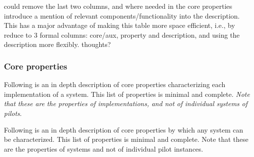 \documentclass{sig-alternate}
\begin{document}
\begin{table}
{{    could remove the last two columns, and where needed in the core properties
    introduce a mention of relevant components/functionality into the
    description. This has a major advantage of making this table more space
    efficient, i.e., by reduce to 3 formal columns: core/aux,
    property and description, and using the description more flexibly. thoughts?}
}
\label{table:property_component_mapping}
\end{table}

\subsubsection{Core properties}
\label{sec:coreprops}

Following is an in depth description of core properties characterizing each
implementation of a \pilot system. This list of properties is minimal and
complete. \textit{Note that these are the properties of \pilot implementations,
and not of individual systems of pilots}.

 

Following is an in depth description of core properties by which any \pilot
system can be characterized. This list of properties is minimal and
complete. Note that these are the properties of \pilot systems and not of
individual pilot instances.
\end{document}
